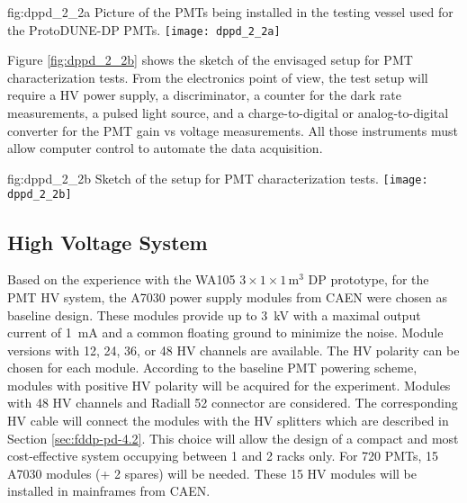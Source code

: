 \begin{dunefigure}{fig:dppd_2_2a}
{Picture of the PMTs being installed in the testing vessel used for the ProtoDUNE-DP PMTs.}
\texttt{[image: dppd\_2\_2a]}
\end{dunefigure}

Figure \ref{fig:dppd_2_2b} shows the sketch of the envisaged setup for PMT characterization tests. From the electronics point of view, the test setup will require a HV power supply, a discriminator, a counter for the dark rate measurements, a pulsed light source, and a charge-to-digital or analog-to-digital converter for the PMT gain vs voltage measurements. All those instruments must allow computer control to automate the data acquisition.

\begin{dunefigure}{fig:dppd_2_2b}
{Sketch of the setup for PMT characterization tests.}
\texttt{[image: dppd\_2\_2b]}
\end{dunefigure}

\subsection{High Voltage System}
\label{sec:fddp-pd-2.3}

Based on the experience with the WA105 $3\times1\times1$\,m$^3$ DP prototype, for the PMT HV system, the A7030 power supply modules from CAEN \cite{caen-a7030} were chosen as baseline design. These modules provide up to \SI{3}{kV} with a maximal output current of \SI{1}{mA} and a common floating ground to minimize the noise. Module versions with \num{12}, \num{24}, \num{36}, or \num{48} HV channels are available. The HV polarity can be chosen for each module. According to the baseline PMT powering scheme, modules with positive HV polarity will be acquired for the experiment. Modules with \num{48} HV channels and Radiall \num{52} connector are considered. The corresponding HV cable will connect the modules with the HV splitters which are described in Section \ref{sec:fddp-pd-4.2}. This choice will allow the design of a compact and most cost-effective system occupying between \num{1} and \num{2} racks only. For \num{720} PMTs, \num{15} A7030 modules (+ \num{2} spares) will be needed. These \num{15} HV modules will be installed in mainframes from CAEN.

